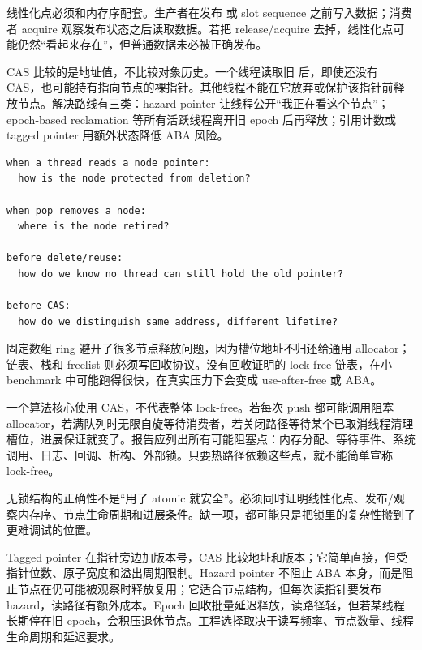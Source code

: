 线性化点必须和内存序配套。生产者在发布  或 slot sequence 之前写入数据；消费者 acquire 观察发布状态之后读取数据。若把 release/acquire 去掉，线性化点可能仍然“看起来存在”，但普通数据未必被正确发布。

CAS 比较的是地址值，不比较对象历史。一个线程读取旧  后，即使还没有 CAS，也可能持有指向节点的裸指针。其他线程不能在它放弃或保护该指针前释放节点。解决路线有三类：hazard pointer 让线程公开“我正在看这个节点”；epoch-based reclamation 等所有活跃线程离开旧 epoch 后再释放；引用计数或 tagged pointer 用额外状态降低 ABA 风险。

\begin{lstlisting}[numbers=none,caption={节点回收证明要回答的问题}]
when a thread reads a node pointer:
  how is the node protected from deletion?

when pop removes a node:
  where is the node retired?

before delete/reuse:
  how do we know no thread can still hold the old pointer?

before CAS:
  how do we distinguish same address, different lifetime?
\end{lstlisting}

固定数组 ring 避开了很多节点释放问题，因为槽位地址不归还给通用 allocator；链表、栈和 freelist 则必须写回收协议。没有回收证明的 lock-free 链表，在小 benchmark 中可能跑得很快，在真实压力下会变成 use-after-free 或 ABA。

一个算法核心使用 CAS，不代表整体 lock-free。若每次 push 都可能调用阻塞 allocator，若满队列时无限自旋等待消费者，若关闭路径等待某个已取消线程清理槽位，进展保证就变了。报告应列出所有可能阻塞点：内存分配、等待事件、系统调用、日志、回调、析构、外部锁。只要热路径依赖这些点，就不能简单宣称 lock-free。

\begin{warningbox}
无锁结构的正确性不是“用了 atomic 就安全”。必须同时证明线性化点、发布/观察内存序、节点生命周期和进展条件。缺一项，都可能只是把锁里的复杂性搬到了更难调试的位置。
\end{warningbox}

Tagged pointer 在指针旁边加版本号，CAS 比较地址和版本；它简单直接，但受指针位数、原子宽度和溢出周期限制。Hazard pointer 不阻止 ABA 本身，而是阻止节点在仍可能被观察时释放复用；它适合节点结构，但每次读指针要发布 hazard，读路径有额外成本。Epoch 回收批量延迟释放，读路径轻，但若某线程长期停在旧 epoch，会积压退休节点。工程选择取决于读写频率、节点数量、线程生命周期和延迟要求。


